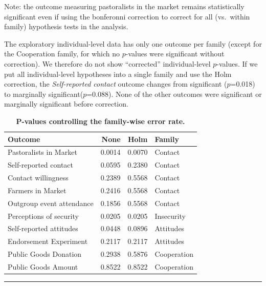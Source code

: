 \documentclass[
]{article}
\begin{document}
Note: the outcome measuring pastoralists in the market remains
statistically significant even if using the bonferonni correction to
correct for all (vs.~within family) hypothesis tests in the analysis.

The exploratory individual-level data has only one outcome per family
(except for the Cooperation family, for which no \(p\)-values were
significant without correction). We therefore do not show ``corrected''
individual-level \(p\)-values. If we put all individual-level hypotheses
into a single family and use the Holm correction, the
\emph{Self-reported contact} outcome changes from significant
(\(p\)=0.018) to marginally significant(\(p\)=0.088). None of the other
outcomes were significant or marginally significant before correction.

\begin{table}[H]
\begin{center}
\label{tab:holm_tab}
\caption{\textbf{P-values controlling the family-wise error rate.}}
\smallskip

\begin{tabular}{l|r|r|l}
\hline
Outcome & None & Holm & Family\\
\hline
Pastoralists in Market & 0.0014 & 0.0070 & Contact\\
\hline
Self-reported contact & 0.0595 & 0.2380 & Contact\\
\hline
Contact willingness & 0.2389 & 0.5568 & Contact\\
\hline
Farmers in Market & 0.2416 & 0.5568 & Contact\\
\hline
Outgroup event attendance & 0.1856 & 0.5568 & Contact\\
\hline
Perceptions of security & 0.0205 & 0.0205 & Insecurity\\
\hline
Self-reported attitudes & 0.0448 & 0.0896 & Attitudes\\
\hline
Endorsement Experiment & 0.2117 & 0.2117 & Attitudes\\
\hline
Public Goods Donation & 0.2938 & 0.5876 & Cooperation\\
\hline
Public Goods Amount & 0.8522 & 0.8522 & Cooperation\\
\hline
\end{tabular}


\end{center}
\end{table}

\begin{center}\rule{0.5\linewidth}{0.5pt}\end{center}
\end{document}
